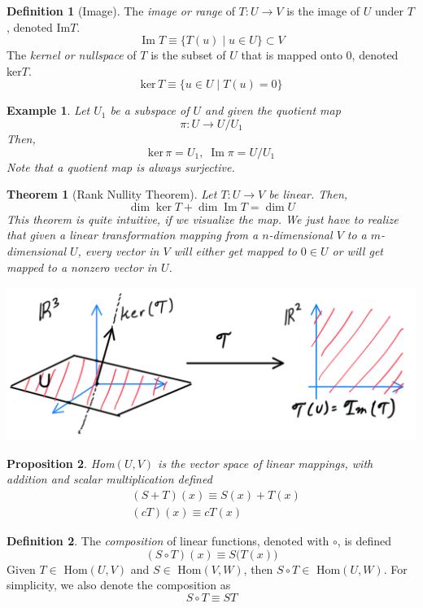 \documentclass{article}
\DeclareMathOperator{\im}{Im}
\newtheorem{theorem}{Theorem}[section]
\newtheorem{proposition}[theorem]{Proposition}
\newtheorem{example}{Example}[section]
\theoremstyle{remark}
\theoremstyle{definition}
\newtheorem{definition}{Definition}[section]
\begin{document}
\begin{definition}[Image]
The \textit{image or range} of $T: U \longrightarrow V$ is the image of $U$ under $T$, denoted Im$T$. 
\[\im{T} \equiv \{ T(u) \; | \; u \in U\} \subset V\]
The \textit{kernel or nullspace} of $T$ is the subset of $U$ that is mapped onto $0$, denoted ker$T$. 
\[\text{ker}\,T \equiv \{ u \in U \; | \; T(u) = 0\} \]
\end{definition}

\begin{example}
Let $U_1$ be a subspace of $U$ and given the quotient map
\[ \pi: U \longrightarrow U / U_1\]
Then, 
\[\text{ker}\,\pi = U_1, \; \im{\pi} = U / U_1\]
Note that a quotient map is always surjective. 
\end{example}

\begin{theorem}[Rank Nullity Theorem]
Let $T: U \longrightarrow V$ be linear. Then, 
\[ \dim \ker T + \dim \im T = \dim U\]
This theorem is quite intuitive, if we visualize the map. We just have to realize that given a linear transformation mapping from a $n$-dimensional $V$ to a $m$-dimensional $U$, every vector in $V$ will either get mapped to $0 \in U$ or will get mapped to a nonzero vector in $U$. 
\begin{center}
    \includegraphics[scale=0.4]{img/Rank_Nullity.PNG}
\end{center}
\end{theorem}

\begin{proposition}
Hom$(U, V)$ is the vector space of linear mappings, with addition and scalar multiplication defined
\begin{align*}
    & (S + T) (x) \equiv S(x) + T(x) \\
    & (c T) (x) \equiv c T(x)
\end{align*}
\end{proposition}

\begin{definition}
The \textit{composition} of linear functions, denoted with $\circ$, is defined
\[ (S \circ T) (x) \equiv S\big( T(x)\big) \]
Given $T \in $ Hom$(U, V)$ and $S \in $ Hom$(V, W)$, then $S \circ T \in $ Hom$(U, W)$. For simplicity, we also denote the composition as 
\[ S \circ T \equiv S T\]
\end{definition}
\end{document}
